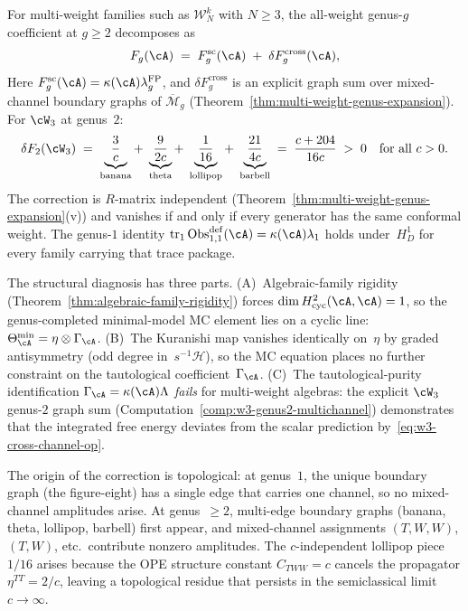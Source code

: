 \begin{proposition}%
\label{op:multi-generator-universality}%
%
%
For multi-weight families such as\/ $\mathcal{W}_N^k$ with
$N \geq 3$, the all-weight genus-$g$ coefficient at $g\geq2$
decomposes as
\begin{equation}\label{eq:multi-weight-decomposition-op}
F_g(\cA)
\;=\;
F_g^{\mathrm{sc}}(\cA)
\;+\;
\delta F_g^{\mathrm{cross}}(\cA),
\end{equation}
Here \(F_g^{\mathrm{sc}}(\cA)=
\kappa(\cA)\lambda_g^{\mathrm{FP}}\), and
$\delta F_g^{\mathrm{cross}}$ is an explicit graph sum over
mixed-channel boundary graphs of\/ $\overline{\mathcal{M}}_g$
(Theorem~\ref{thm:multi-weight-genus-expansion}). For $\cW_3$
at genus~$2$:
\begin{equation}\label{eq:w3-cross-channel-op}
\delta F_2(\cW_3)
\;=\;
\underbrace{\frac{3}{c}}_{\text{banana}}
+\;
\underbrace{\frac{9}{2c}}_{\text{theta}}
+\;
\underbrace{\frac{1}{16}}_{\text{lollipop}}
+\;
\underbrace{\frac{21}{4c}}_{\text{barbell}}
\;=\;
\frac{c + 204}{16c}
\;>\; 0
\quad\text{for all $c > 0$}.
\end{equation}
The correction is $R$-matrix independent
(Theorem~\ref{thm:multi-weight-genus-expansion}(v))
and vanishes if and only if every generator has the same
conformal weight. The genus-$1$ identity
\(\operatorname{tr}_1\operatorname{Obs}^{\mathrm{def}}_{1,1}(\cA)=\kappa(\cA)\lambda_1\)
holds under~$H_D^1$ for every family carrying that trace package.

The structural diagnosis has three parts.
\textup{(A)}~Algebraic-family rigidity
(Theorem~\ref{thm:algebraic-family-rigidity}) forces
$\dim H^2_{\mathrm{cyc}}(\cA, \cA) = 1$, so the
genus-completed minimal-model MC element lies on a cyclic line:
$\Theta_\cA^{\min} = \eta \otimes \Gamma_{\cA}$.
\textup{(B)}~The Kuranishi map vanishes identically on~$\eta$
by graded antisymmetry (odd degree in~$s^{-1}\mathcal{H}$),
so the MC equation places no further constraint on the
tautological coefficient~$\Gamma_\cA$.
\textup{(C)}~The tautological-purity identification
$\Gamma_\cA = \kappa(\cA)\Lambda$ \emph{fails} for
multi-weight algebras: the explicit $\cW_3$ genus-$2$ graph sum
(Computation~\ref{comp:w3-genus2-multichannel})
demonstrates that the integrated free energy deviates from the
scalar prediction by~\eqref{eq:w3-cross-channel-op}.

The origin of the correction is topological: at genus~$1$,
the unique boundary graph (the figure-eight) has a single edge
that carries one channel, so no mixed-channel amplitudes arise.
At genus~$\geq 2$, multi-edge boundary graphs (banana, theta,
lollipop, barbell) first appear, and mixed-channel
assignments $(T, W, W)$, $(T, W)$, etc.\ contribute nonzero
amplitudes. The $c$-independent lollipop piece $1/16$ arises
because the OPE structure constant $C_{TWW} = c$ cancels the
propagator $\eta^{TT} = 2/c$, leaving a topological residue that
persists in the semiclassical limit $c \to \infty$.
\end{proposition}

